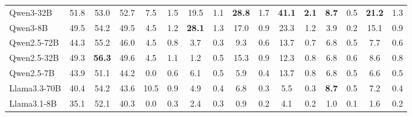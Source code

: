 \begin{table}[!t]
{\begin{tabular}{lccccccccccccccc}
\multicolumn{1}{l|}{Qwen3-32B}                            & 51.8          & 53.0          & \multicolumn{1}{c|}{52.7}          & 7.5           & 1.5          & 19.5           & 1.1          & \cellcolor{LightCyan}\textbf{28.8}  & 1.7          & \cellcolor{LightCyan}\textbf{41.1} & \cellcolor{LightCyan}\textbf{2.1} & \cellcolor{LightCyan}\textbf{8.7}  & \multicolumn{1}{c|}{0.5}          & \cellcolor{LightCyan}\textbf{21.2} & 1.3          \\
\multicolumn{1}{l|}{Qwen3-8B}                             & 49.5          & 54.2          & \multicolumn{1}{c|}{49.5}          & 4.5           & 1.2          & \cellcolor{LightCyan}\textbf{28.1}  & 1.3          & 17.0           & 0.9          & 23.3          & 1.2          & 3.9           & \multicolumn{1}{c|}{0.2}          & 15.1          & 0.9          \\
\multicolumn{1}{l|}{Qwen2.5-72B}                          & 44.3          & 55.2          & \multicolumn{1}{c|}{46.0}          & 4.5           & 0.8          & 3.7            & 0.3          & 9.3            & 0.6          & 13.7          & 0.7          & 6.8           & \multicolumn{1}{c|}{0.5}          & 7.7           & 0.6          \\
\multicolumn{1}{l|}{Qwen2.5-32B}                          & 49.3          & \cellcolor{LightCyan}\textbf{56.3} & \multicolumn{1}{c|}{49.6}          & 4.5           & 1.1          & 1.2            & 0.5          & 15.3           & 0.9          & 12.3          & 0.8          & 6.8           & \multicolumn{1}{c|}{0.6}          & 8.6           & 0.8          \\
\multicolumn{1}{l|}{Qwen2.5-7B}                           & 43.9          & 51.1          & \multicolumn{1}{c|}{44.2}          & 0.0           & 0.6          & 6.1            & 0.5          & 5.9            & 0.4          & 13.7          & 0.8          & 6.8           & \multicolumn{1}{c|}{0.5} & 6.6           & 0.5          \\
\multicolumn{1}{l|}{Llama3.3-70B}                         & 40.4          & 54.2          & \multicolumn{1}{c|}{43.6}          & 10.5          & 0.9          & 4.9            & 0.4          & 6.8            & 0.3          & 5.5           & 0.3          & \cellcolor{LightCyan}\textbf{8.7}  & \multicolumn{1}{c|}{0.5}          & 7.2           & 0.4          \\
\multicolumn{1}{l|}{Llama3.1-8B}                          & 35.1          & 52.1          & \multicolumn{1}{c|}{40.3}          & 0.0           & 0.3          & 2.4            & 0.3          & 0.9            & 0.2          & 4.1           & 0.2          & 1.0           & \multicolumn{1}{c|}{0.1}          & 1.6           & 0.2          \\ \midrule

\end{tabular}}
\end{table}
